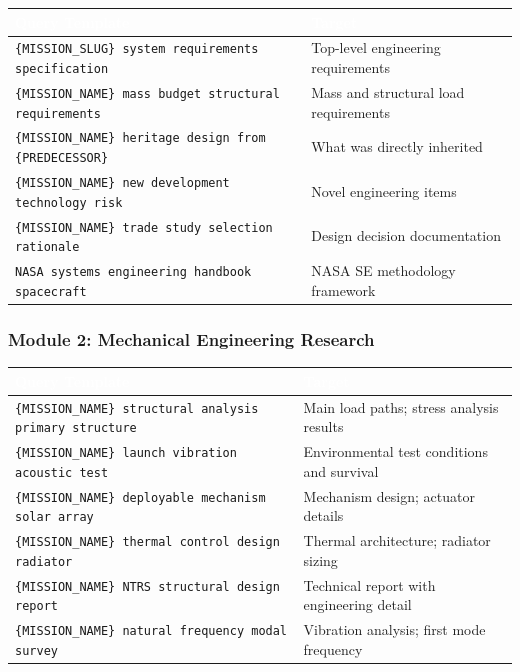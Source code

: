 \documentclass[11pt,letterpaper]{article}
\newcommand{\tableheader}[1]{\textbf{\sffamily\textcolor{white}{#1}}}
\begin{document}
\begin{center}
\begin{tabularx}{\textwidth}{L{4cm}X}
\toprule
{}
\tableheader{Query Template} & \tableheader{Target} \\
\midrule
\texttt{\{MISSION\_SLUG\} system requirements specification} & Top-level engineering requirements \\
\texttt{\{MISSION\_NAME\} mass budget structural requirements} & Mass and structural load requirements \\
\texttt{\{MISSION\_NAME\} heritage design from \{PREDECESSOR\}} & What was directly inherited \\
\texttt{\{MISSION\_NAME\} new development technology risk} & Novel engineering items \\
\texttt{\{MISSION\_NAME\} trade study selection rationale} & Design decision documentation \\
\texttt{NASA systems engineering handbook spacecraft} & NASA SE methodology framework \\
\bottomrule
\end{tabularx}
\end{center}

\subsubsection{Module 2: Mechanical Engineering Research}

\begin{center}
\begin{tabularx}{\textwidth}{L{4cm}X}
\toprule
{}
\tableheader{Query Template} & \tableheader{Target} \\
\midrule
\texttt{\{MISSION\_NAME\} structural analysis primary structure} & Main load paths; stress analysis results \\
\texttt{\{MISSION\_NAME\} launch vibration acoustic test} & Environmental test conditions and survival \\
\texttt{\{MISSION\_NAME\} deployable mechanism solar array} & Mechanism design; actuator details \\
\texttt{\{MISSION\_NAME\} thermal control design radiator} & Thermal architecture; radiator sizing \\
\texttt{\{MISSION\_NAME\} NTRS structural design report} & Technical report with engineering detail \\
\texttt{\{MISSION\_NAME\} natural frequency modal survey} & Vibration analysis; first mode frequency \\
\bottomrule
\end{tabularx}
\end{center}
\end{document}
